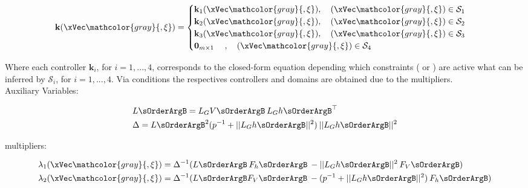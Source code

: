 \begin{equation}
    \mathbf{k}(\xVec \mathcolor{gray}{, \mathbf{\xi}}) =
    \begin{cases}
        \mathbf{k}_1(\xVec \mathcolor{gray}{, \mathbf{\xi}}), \quad (\xVec \mathcolor{gray}{, \mathbf{\xi}}) \in \mathcal{S}_1 \\
        \mathbf{k}_2(\xVec \mathcolor{gray}{, \mathbf{\xi}}), \quad (\xVec \mathcolor{gray}{, \mathbf{\xi}}) \in \mathcal{S}_2 \\
        \mathbf{k}_3(\xVec \mathcolor{gray}{, \mathbf{\xi}}), \quad (\xVec \mathcolor{gray}{, \mathbf{\xi}}) \in \mathcal{S}_3 \\
        \mathbf{0}_{m \times 1 } \quad  \hspace{0.25em}, \quad (\xVec \mathcolor{gray}{, \mathbf{\xi}}) \in \mathcal{S}_4
    \end{cases}
    \label{eq:closed-form_controller}
\end{equation}


Where each controller \(\mathbf{k}_i\), for \( i = 1, ..., 4 \), corresponds to the closed-form equation depending which constraints ( or ) are active what can be inferred by \(\mathcal{S}_i\), for \( i = 1, ..., 4 \). Via  conditions the respectives controllers and domains are obtained due to the  multipliers.\\

Auxiliary Variables:

\begin{align*}
    & L \sOrderArgB = L_GV \sOrderArgB \hspace{0.2em} L_Gh\sOrderArgB^{\top} \\
    & \Delta = L \sOrderArgB^2 (p^{-1} + ||L_Gh\sOrderArgB||^2)  \hspace{0.2em} || L_Gh\sOrderArgB||^2
\end{align*}

 multipliers:

\begin{align}
    & \lambda_1(\xVec \mathcolor{gray}{, \mathbf{\xi}}) = \Delta^{-1} (L \sOrderArgB \hspace{0.2em} F_h \sOrderArgB \hspace{0.2em} - ||L_Gh\sOrderArgB||^2  \hspace{0.2em}F_V \sOrderArgB)
    \notag\\
    & \lambda_2(\xVec \mathcolor{gray}{, \mathbf{\xi}}) = \Delta^{-1} (L \sOrderArgB F_V \sOrderArgB \hspace{0.2em} - (p^{-1} + ||L_Gh\sOrderArgB||^2)  \hspace{0.2em}F_h \sOrderArgB) 
    \label{eq:KKT-Multipliers_formulas}
\end{align}


